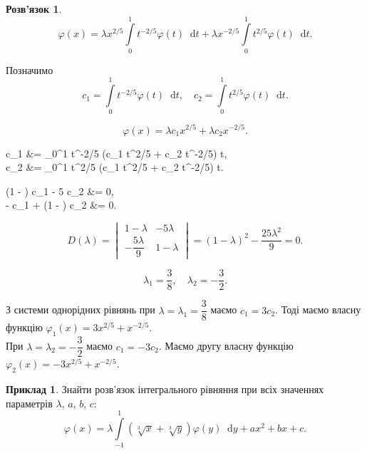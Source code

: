 \documentclass[a4paper, 12pt]{book}
\theoremstyle{definition}
\newtheorem{example}{Приклад}
\newtheorem*{solution*}{Розв'язок}
\newcommand*\diff{\mathop{}\!\mathrm{d}}
\renewcommand{\phi}{\varphi}
\newcommand{\Int}{\displaystyle\int\limits}
\newenvironment{system*}{\begin{equation*} \left\{\begin{aligned}}{\end{aligned} \right. \end{equation*}}
\begin{document}
\begin{solution*}
	\[ \phi(x) = \lambda x^{2 / 5} \Int_0^1 t^{-2/5} \phi(t) \diff t + \lambda x^{-2/5} \Int_0^1 t^{2/5} \phi(t) \diff t. \]

	Позначимо \[ c_1 = \Int_0^1 t^{-2/5} \phi(t) \diff t, \quad c_2 = \Int_0^1 t^{2/5} \phi(t) \diff t. \]

	\[ \phi(x) = \lambda c_1 x^{2/5} + \lambda c_2 x^{-2/5}. \]
	
	\begin{system*}
		c_1 &= \Int_0^1 t^{-2/5} (\lambda c_1 t^{2/5} + \lambda c_2 t^{-2/5}) \diff t, \\
		c_2 &= \Int_0^1 t^{2/5} (\lambda c_1 t^{2/5} + \lambda c_2 t^{-2/5}) \diff t.
	\end{system*}
	
	\begin{system*}
		(1 - \lambda) c_1 - 5 \lambda c_2 &= 0, \\
		- c_1 + (1 - \lambda) c_2 &= 0.
	\end{system*}
	
	\[ D(\lambda) = \begin{vmatrix} 1 - \lambda & - 5 \lambda \\ - \dfrac{5\lambda}{9} & 1 - \lambda \end{vmatrix} = (1 - \lambda)^2 - \dfrac{25\lambda^2}{9} = 0. \]
	
	\[ \lambda_1 = \dfrac{3}{8}, \quad \lambda_2 = - \dfrac{3}{2}. \]
	
	З системи однорідних рівнянь при $\lambda = \lambda_1 = \dfrac{3}{8}$ маємо $c_1 = 3 c_2$. Тоді маємо власну функцію $\phi_1(x) = 3 x^{2 / 5} + x^{-2 / 5}$. \\

	При $\lambda = \lambda_2 = - \dfrac{3}{2}$ маємо $c_1 = - 3 c_2$. Маємо другу власну функцію $\phi_2(x) = - 3 x^{2 / 5} + x^{-2 / 5}$.
\end{solution*}

\newpage

\begin{example}
	Знайти розв’язок інтегрального рівняння при всіх значеннях параметрів $\lambda$, $a$, $b$, $c$: \[\phi(x) = \lambda \Int_{-1}^1 (\sqrt[3]{x} + \sqrt[3]{y}) \phi(y) \diff y + ax^2 + bx + c. \]
\end{example}
\end{document}
